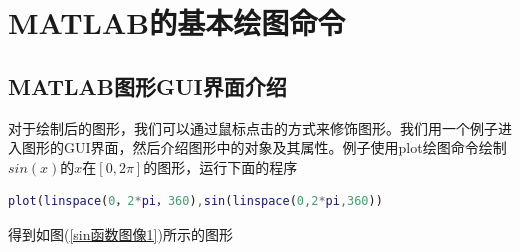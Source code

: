 \section{MATLAB的基本绘图命令}
    \subsection{MATLAB图形GUI界面介绍}
        \par
        对于绘制后的图形，我们可以通过鼠标点击的方式来修饰图形。我们用一个例子进入图形的GUI界面，然后介绍图形中的对象及其属性。例子使用plot绘图命令绘制$sin(x)$的$x$在$[0,2\pi]$的图形，运行下面的程序
        \begin{lstlisting}[language = Matlab]
        plot(linspace(0，2*pi，360),sin(linspace(0,2*pi,360))
        \end{lstlisting}
        得到如图(\ref{sin函数图像1})所示的图形
